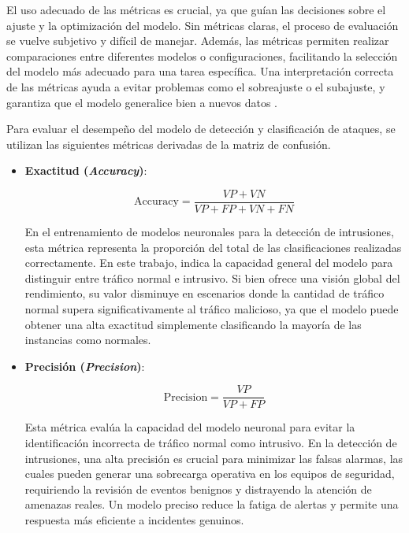 El uso adecuado de las métricas es crucial, ya que guían las decisiones sobre el ajuste y la optimización del modelo. Sin métricas claras, el proceso de evaluación se vuelve subjetivo y difícil de manejar. Además, las métricas permiten realizar comparaciones entre diferentes modelos o configuraciones, facilitando la selección del modelo más adecuado para una tarea específica. Una interpretación correcta de las métricas ayuda a evitar problemas como el sobreajuste o el subajuste, y garantiza que el modelo generalice bien a nuevos datos \cite{goodfellow2016deep}.

Para evaluar el desempeño del modelo de detección y clasificación de ataques, se utilizan las siguientes métricas derivadas de la matriz de confusión.


\begin{itemize}
    \item \textbf{Exactitud (\textit{Accuracy})}: \label{met:Accuracy}
    
\begin{equation}
    \text{Accuracy} = \frac{VP + VN}{VP + FP + VN + FN}
\end{equation}

En el entrenamiento de modelos neuronales para la detección de intrusiones, esta métrica representa la proporción del total de las clasificaciones realizadas correctamente. En este trabajo, indica la capacidad general del modelo para distinguir entre tráfico normal e intrusivo. Si bien ofrece una visión global del rendimiento, su valor disminuye en escenarios donde la cantidad de tráfico normal supera significativamente al tráfico malicioso, ya que el modelo puede obtener una alta exactitud simplemente clasificando la mayoría de las instancias como normales.

\item \textbf{Precisión (\textit{Precision})}: \label{met:Precision}

\begin{equation}
    \text{Precision} = \frac{VP}{VP + FP}
\end{equation}

Esta métrica evalúa la capacidad del modelo neuronal para evitar la identificación incorrecta de tráfico normal como intrusivo. En la detección de intrusiones, una alta precisión es crucial para minimizar las falsas alarmas, las cuales pueden generar una sobrecarga operativa en los equipos de seguridad, requiriendo la revisión de eventos benignos y distrayendo la atención de amenazas reales. Un modelo preciso reduce la fatiga de alertas y permite una respuesta más eficiente a incidentes genuinos.


\end{itemize}
